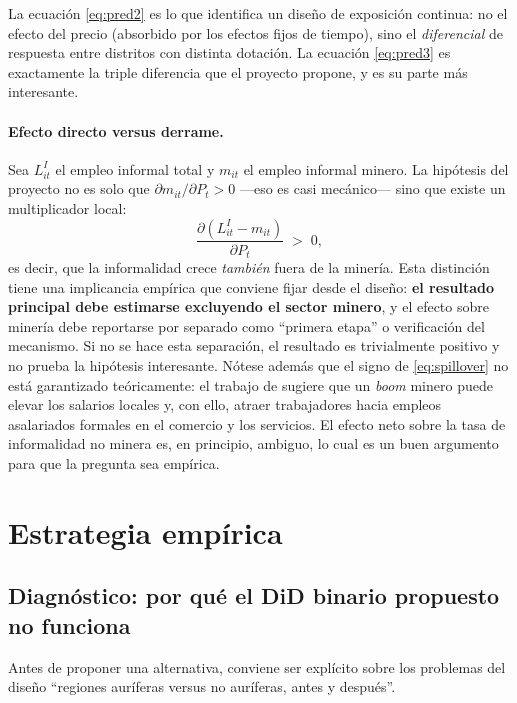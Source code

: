\documentclass[11pt,a4paper]{article}
\begin{document}
La ecuación \eqref{eq:pred2} es lo que identifica un diseño de exposición continua: no el efecto del precio (absorbido por los efectos fijos de tiempo), sino el \emph{diferencial} de respuesta entre distritos con distinta dotación. La ecuación \eqref{eq:pred3} es exactamente la triple diferencia que el proyecto propone, y es su parte más interesante.

\paragraph{Efecto directo versus derrame.} Sea $L^{I}_{it}$ el empleo informal total y $m_{it}$ el empleo informal minero. La hipótesis del proyecto no es solo que $\partial m_{it}/\partial P_t > 0$ ---eso es casi mecánico--- sino que existe un multiplicador local:
\begin{equation}
\frac{\partial (L^{I}_{it} - m_{it})}{\partial P_t} \;>\; 0 ,
\label{eq:spillover}
\end{equation}
es decir, que la informalidad crece \emph{también} fuera de la minería. Esta distinción tiene una implicancia empírica que conviene fijar desde el diseño: \textbf{el resultado principal debe estimarse excluyendo el sector minero}, y el efecto sobre minería debe reportarse por separado como ``primera etapa'' o verificación del mecanismo. Si no se hace esta separación, el resultado es trivialmente positivo y no prueba la hipótesis interesante. Nótese además que el signo de \eqref{eq:spillover} no está garantizado teóricamente: el trabajo de \citet{aragon2013} sugiere que un \emph{boom} minero puede elevar los salarios locales y, con ello, atraer trabajadores hacia empleos asalariados formales en el comercio y los servicios. El efecto neto sobre la tasa de informalidad no minera es, en principio, ambiguo, lo cual es un buen argumento para que la pregunta sea empírica.

\section{Estrategia empírica}\label{sec:empirica}

\subsection{Diagnóstico: por qué el DiD binario propuesto no funciona}

Antes de proponer una alternativa, conviene ser explícito sobre los problemas del diseño ``regiones auríferas versus no auríferas, antes y después''.
\end{document}
